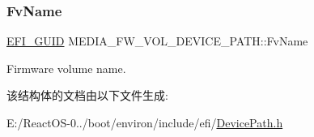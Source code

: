\subsubsection{\texorpdfstring{Fv\+Name}{FvName}}
{\footnotesize\ttfamily \hyperlink{_uefi_base_type_8h_ad87614428813f71edb2c2d802e9ce2af}{E\+F\+I\+\_\+\+G\+U\+ID} M\+E\+D\+I\+A\+\_\+\+F\+W\+\_\+\+V\+O\+L\+\_\+\+D\+E\+V\+I\+C\+E\+\_\+\+P\+A\+T\+H\+::\+Fv\+Name}

Firmware volume name. 

该结构体的文档由以下文件生成\+:\begin{DoxyCompactItemize}
\item 
E\+:/\+React\+O\+S-\/0../boot/environ/include/efi/\hyperlink{_device_path_8h}{Device\+Path.\+h}\end{DoxyCompactItemize}
